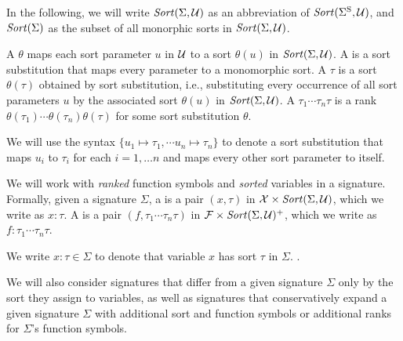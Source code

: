 \begin{newver}
\begin{notation}
In the following, we will write $\mathit{Sort}(\Sigma, \mathcal{U})$ as an abbreviation 
of $\mathit{Sort}(\Sigma^\mathrm{S}, \mathcal{U})$, and $\mathit{Sort}(\Sigma)$ as the subset of all 
monorphic sorts in $\mathit{Sort}(\Sigma, \mathcal{U})$.
\end{notation}

\begin{definition}
A  $\theta$
maps each sort parameter $u$ in $\mathcal{U}$ to a sort $\theta(u)$ in $\mathit{Sort}(\Sigma,\mathcal{U})$.
A  is a sort substitution that maps every parameter
to a monomorphic sort.
A  $\tau$ is a sort $\theta(\tau)$ obtained
by sort substitution, i.e.,
substituting every occurrence of all sort parameters $u$ by the associated sort
$\theta(u)$ in $\mathit{Sort}(\Sigma,\mathcal{U})$.
A  $\tau_1\cdots\tau_n \tau$ is a rank
$\theta(\tau_1)\cdots\theta(\tau_n)\theta(\tau)$ for some sort substitution
$\theta$.
\end{definition}
We will use the syntax $\{u_1 \mapsto \tau_1, \cdots u_n \mapsto \tau_n \}$
to denote a sort substitution that maps $u_i$ to $\tau_i$ for each $i=1,\dots n$
and maps every other sort parameter to itself.
\end{newver}

We will work with \emph{ranked} function symbols and \emph{sorted} variables
in a signature.
Formally,
given a signature $\Sigma$,
a  is 
a pair $(x,\tau)$ in $\mathcal{X} \times \mathit{Sort}(\Sigma, \mathcal{U})$,
which we write as $x{:}\tau$.
A  is 
a pair $(f, \tau_1\cdots\tau_n\tau)$ in $\mathcal{F} \times \mathit{Sort}(\Sigma, \mathcal{U})^+$,
which we write as $f{:}\tau_1\cdots\tau_n\tau$.

\begin{notation}
We write $x{:}\tau \in \Sigma$
to denote that variable $x$ has sort $\tau$ in $\Sigma$.
.
\end{notation}

We will also consider signatures that differ from a given signature $\Sigma$
only by the sort they assign to variables,
as well as signatures that conservatively expand a given signature $\Sigma$
with additional sort and function symbols or additional ranks 
for $\Sigma$'s function symbols.

